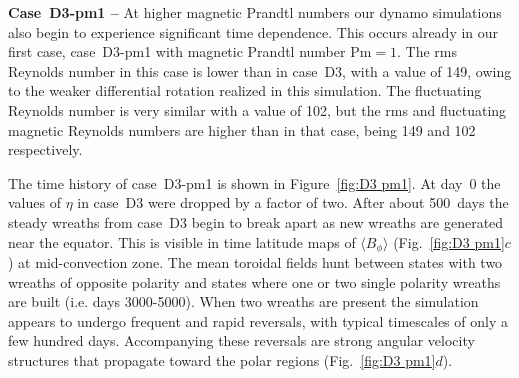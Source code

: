 \textbf{Case~D3-pm1 --} At higher magnetic Prandtl numbers our dynamo
simulations also begin 
to experience significant time dependence.  This occurs already in our
first case, case~D3-pm1 with magnetic Prandtl number $\mathrm{Pm}=1$. 
The rms Reynolds number in this case is lower than in case~D3, with a
value of 149, owing to the weaker differential rotation realized in
this simulation.  The fluctuating Reynolds number is very similar with
a value of 102, but the rms and fluctuating magnetic Reynolds numbers
are higher than in that case, being 149 and 102 respectively. 

The time history of case~D3-pm1 is shown in Figure~\ref{fig:D3 pm1}.
At day~0 the values of $\eta$ in case~D3 were dropped by a factor of
two.  After about 500~days the steady wreaths from case~D3 begin to
break apart as new wreaths are generated near the equator.  This is
visible in time latitude maps of $\langle B_\phi \rangle$
(Fig.~\ref{fig:D3 pm1}$c$) at mid-convection zone.  The mean toroidal
fields hunt between states with two wreaths of opposite polarity and
states where one or two single polarity wreaths are built (i.e. days
3000-5000).  When two wreaths are present the simulation appears to
undergo frequent and rapid reversals, with typical timescales of only
a few hundred days.  Accompanying these reversals are strong angular
velocity structures that propagate toward the polar regions
(Fig.~\ref{fig:D3 pm1}$d$).

